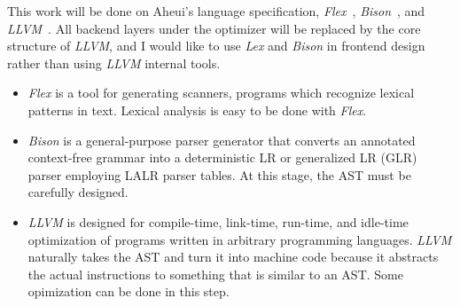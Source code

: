 This work will be done on Aheui's language specification, \textit{Flex}~\cite{lesk1975lex}, \textit{Bison}~\cite{aaby2003compiler}, and \textit{LLVM}~\cite{lattner2004llvm}. All backend layers under the optimizer will be replaced by the core structure of \textit{LLVM}, and I would like to use \textit{Lex} and \textit{Bison} in frontend design rather than using \textit{LLVM} internal tools. 
\\
\begin{itemize}
\item \textit{Flex} is a tool for generating scanners, programs which recognize lexical patterns in text. Lexical analysis is easy to be done with \textit{Flex}.
\item \textit{Bison} is a general-purpose parser generator that converts an annotated context-free grammar into a deterministic LR or generalized LR (GLR) parser employing LALR parser tables. At this stage, the AST must be carefully designed.
\item \textit{LLVM} is designed for compile-time, link-time, run-time, and idle-time optimization of programs written in arbitrary programming languages. \textit{LLVM} naturally takes the AST and turn it into machine code because it abstracts the actual instructions to something that is similar to an AST. Some opimization can be done in this step.
\end{itemize}

